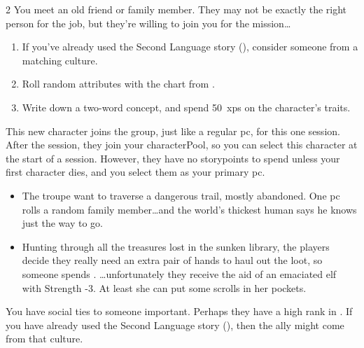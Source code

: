\begin{multicols}{2}
\label{oldFriend}
You meet an old friend or family member.
They may not be exactly the right person for the job, but they're willing to join you for the mission\ldots

\begin{enumerate}
  \item
  If you've already used the Second Language story (), consider someone from a matching culture.
  \item
  Roll random \glspl{attribute} with the chart from .
  \item
  Write down a two-word concept, and spend 50~\glspl{xp} on the character's \glspl{trait}.
\end{enumerate}

This new character joins the group, just like a regular \gls{pc}, for this one session.
After the session, they join your \gls{characterPool}, so you can select this character at the start of a session.
However, they have no \glspl{storypoint} to spend unless your first character dies, and you select them as your primary \gls{pc}.

\begin{exampletext}
  \begin{itemize}
    \item
    The troupe want to traverse a dangerous trail, mostly abandoned.
    One \gls{pc} rolls a random family member\ldots and the world's thickest human says he knows just the way to go.
    \item
    Hunting through all the treasures lost in the sunken library, the players decide they really need an extra pair of hands to haul out the loot, so someone spends .
    \ldots unfortunately they receive the aid of an emaciated elf with Strength -3.
    At least she can put some scrolls in her pockets.
  \end{itemize}
\end{exampletext}

\label{designCharacter}
You have social ties to someone important.
Perhaps they have a high rank in .
If you have already used the Second Language story (), then the ally might come from that culture.


\end{multicols}
